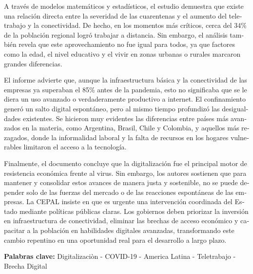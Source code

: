 \begin{tcolorbox}[colback=brown!8!white,colframe=brown!8!white,boxrule=0pt,arc=2pt,left=4pt,right=4pt,top=3pt,bottom=3pt,before skip=4pt,after skip=4pt]
\begin{otherlanguage}{spanish}
A través de modelos matemáticos y estadísticos, el estudio demuestra que existe una relación directa entre la severidad de las cuarentenas y el aumento del teletrabajo y la conectividad. De hecho, en los momentos más críticos, cerca del 34\% de la población regional logró trabajar a distancia. Sin embargo, el análisis también revela que este aprovechamiento no fue igual para todos, ya que factores como la edad, el nivel educativo y el vivir en zonas urbanas o rurales marcaron grandes diferencias.

El informe advierte que, aunque la infraestructura básica y la conectividad de las empresas ya superaban el 85\% antes de la pandemia, esto no significaba que se le diera un uso avanzado o verdaderamente productivo a internet. El confinamiento generó un salto digital espontáneo, pero al mismo tiempo profundizó las desigualdades existentes. Se hicieron muy evidentes las diferencias entre países más avanzados en la materia, como Argentina, Brasil, Chile y Colombia, y aquellos más rezagados, donde la informalidad laboral y la falta de recursos en los hogares vulnerables limitaron el acceso a la tecnología.

Finalmente, el documento concluye que la digitalización fue el principal motor de resistencia económica frente al virus. Sin embargo, los autores sostienen que para mantener y consolidar estos avances de manera justa y sostenible, no se puede depender solo de las fuerzas del mercado o de las reacciones espontáneas de las empresas. La CEPAL insiste en que es urgente una intervención coordinada del Estado mediante políticas públicas claras. Los gobiernos deben priorizar la inversión en infraestructura de conectividad, eliminar las brechas de acceso económico y capacitar a la población en habilidades digitales avanzadas, transformando este cambio repentino en una oportunidad real para el desarrollo a largo plazo.
\par\smallskip\noindent\textbf{Palabras clave:} Digitalizaciòn - COVID-19 - America Latina - Teletrabajo - Brecha Digital
\end{otherlanguage}
\end{tcolorbox}

